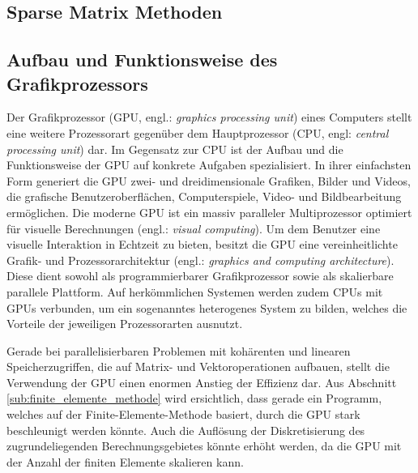 \documentclass[crop=false]{standalone}
\begin{document}
    \subsection{Sparse Matrix Methoden} %
    \label{sub:sparse_matrix_methoden}


    \subsection{Aufbau und Funktionsweise des Grafikprozessors} %
    \label{sub:aufbau_und_funktionsweise_des_grafikprozessors}
      Der Grafikprozessor (GPU, engl.: \textit{graphics processing unit}) eines Computers stellt eine weitere Prozessorart gegenüber dem Hauptprozessor (CPU, engl: \textit{central processing unit}) dar.
      Im Gegensatz zur CPU ist der Aufbau und die Funktionsweise der GPU auf konkrete Aufgaben spezialisiert.
      In ihrer einfachsten Form generiert die GPU zwei- und dreidimensionale Grafiken, Bilder und Videos, die grafische Benutzeroberflächen, Computerspiele, Video- und Bildbearbeitung ermöglichen.
      Die moderne GPU ist ein massiv paralleler Multiprozessor optimiert für visuelle Berechnungen (engl.: \textit{visual computing}).
      Um dem Benutzer eine visuelle Interaktion in Echtzeit zu bieten, besitzt die GPU eine vereinheitlichte Grafik- und Prozessorarchitektur (engl.: \textit{graphics and computing architecture}).
      Diese dient sowohl als programmierbarer Grafikprozessor sowie als skalierbare parallele Plattform.
      Auf herkömmlichen Systemen werden zudem CPUs mit GPUs verbunden, um ein sogenanntes heterogenes System zu bilden, welches die Vorteile der jeweiligen Prozessorarten ausnutzt.
      \cite[S.~A3]{Patterson2011}

      Gerade bei parallelisierbaren Problemen mit kohärenten und linearen Speicherzugriffen, die auf Matrix- und Vektoroperationen aufbauen, stellt die Verwendung der GPU einen enormen Anstieg der Effizienz dar.
      Aus Abschnitt \ref{sub:finite_elemente_methode} wird ersichtlich, dass gerade ein Programm, welches auf der Finite-Elemente-Methode basiert, durch die GPU stark beschleunigt werden könnte.
      Auch die Auflösung der Diskretisierung des zugrundeliegenden Berechnungsgebietes könnte erhöht werden, da die GPU mit der Anzahl der finiten Elemente skalieren kann.
\end{document}

